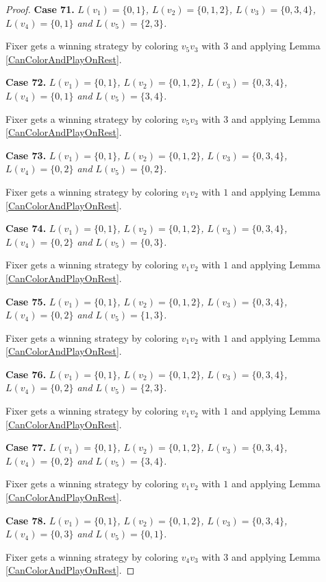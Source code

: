 \documentclass[12pt]{amsart}
\theoremstyle{plain}
\theoremstyle{definition}
\theoremstyle{remark}
\begin{document}
\begin{proof}
\noindent\textbf{Case 71.  }\textit{$L(v_1) = \{0, 1\}$, $L(v_2) = \{0, 1, 2\}$, $L(v_3) = \{0, 3, 4\}$, $L(v_4) = \{0, 1\}$ and $L(v_5) = \{2, 3\}$.}

Fixer gets a winning strategy by coloring $v_5v_3$ with $3$ and applying Lemma \ref{CanColorAndPlayOnRest}.

\noindent\textbf{Case 72.  }\textit{$L(v_1) = \{0, 1\}$, $L(v_2) = \{0, 1, 2\}$, $L(v_3) = \{0, 3, 4\}$, $L(v_4) = \{0, 1\}$ and $L(v_5) = \{3, 4\}$.}

Fixer gets a winning strategy by coloring $v_5v_3$ with $3$ and applying Lemma \ref{CanColorAndPlayOnRest}.

\noindent\textbf{Case 73.  }\textit{$L(v_1) = \{0, 1\}$, $L(v_2) = \{0, 1, 2\}$, $L(v_3) = \{0, 3, 4\}$, $L(v_4) = \{0, 2\}$ and $L(v_5) = \{0, 2\}$.}

Fixer gets a winning strategy by coloring $v_1v_2$ with $1$ and applying Lemma \ref{CanColorAndPlayOnRest}.

\noindent\textbf{Case 74.  }\textit{$L(v_1) = \{0, 1\}$, $L(v_2) = \{0, 1, 2\}$, $L(v_3) = \{0, 3, 4\}$, $L(v_4) = \{0, 2\}$ and $L(v_5) = \{0, 3\}$.}

Fixer gets a winning strategy by coloring $v_1v_2$ with $1$ and applying Lemma \ref{CanColorAndPlayOnRest}.

\noindent\textbf{Case 75.  }\textit{$L(v_1) = \{0, 1\}$, $L(v_2) = \{0, 1, 2\}$, $L(v_3) = \{0, 3, 4\}$, $L(v_4) = \{0, 2\}$ and $L(v_5) = \{1, 3\}$.}

Fixer gets a winning strategy by coloring $v_1v_2$ with $1$ and applying Lemma \ref{CanColorAndPlayOnRest}.

\noindent\textbf{Case 76.  }\textit{$L(v_1) = \{0, 1\}$, $L(v_2) = \{0, 1, 2\}$, $L(v_3) = \{0, 3, 4\}$, $L(v_4) = \{0, 2\}$ and $L(v_5) = \{2, 3\}$.}

Fixer gets a winning strategy by coloring $v_1v_2$ with $1$ and applying Lemma \ref{CanColorAndPlayOnRest}.

\noindent\textbf{Case 77.  }\textit{$L(v_1) = \{0, 1\}$, $L(v_2) = \{0, 1, 2\}$, $L(v_3) = \{0, 3, 4\}$, $L(v_4) = \{0, 2\}$ and $L(v_5) = \{3, 4\}$.}

Fixer gets a winning strategy by coloring $v_1v_2$ with $1$ and applying Lemma \ref{CanColorAndPlayOnRest}.

\noindent\textbf{Case 78.  }\textit{$L(v_1) = \{0, 1\}$, $L(v_2) = \{0, 1, 2\}$, $L(v_3) = \{0, 3, 4\}$, $L(v_4) = \{0, 3\}$ and $L(v_5) = \{0, 1\}$.}

Fixer gets a winning strategy by coloring $v_4v_3$ with $3$ and applying Lemma \ref{CanColorAndPlayOnRest}.


\end{proof}
\end{document}
